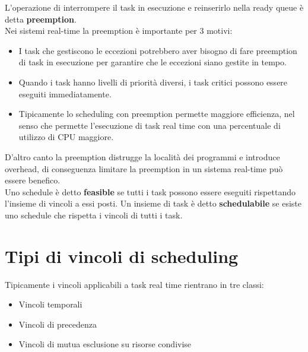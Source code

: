 \documentclass[12pt,openany,onesided]{book}
\begin{document}
L'operazione di interrompere il task in esecuzione e reinserirlo nella ready queue è detta \textbf{preemption}.\\
Nei sistemi real-time la preemption è importante per 3 motivi:
\begin{itemize}
    \item I task che gestiscono le eccezioni potrebbero aver bisogno di fare preemption di task in esecuzione per garantire che le eccezioni siano gestite in tempo.
    \item Quando i task hanno livelli di priorità diversi, i task critici possono essere eseguiti immediatamente.
    \item Tipicamente lo scheduling con preemption permette maggiore efficienza, nel senso che permette l'esecuzione di task real time con una percentuale di utilizzo di CPU maggiore.
\end{itemize}
D'altro canto la preemption distrugge la località dei programmi e introduce overhead, di conseguenza limitare la preemption in un sistema real-time può essere benefico.
\\
Uno schedule è detto \textbf{feasible} se tutti i task possono essere eseguiti rispettando l'insieme di vincoli a essi posti.
Un insieme di task è detto \textbf{schedulabile} se esiste uno schedule che rispetta i vincoli di tutti i task.
\section{Tipi di vincoli di scheduling}
Tipicamente i vincoli applicabili a task real time rientrano in tre classi:
\begin{itemize}
    \item Vincoli temporali
    \item Vincoli di precedenza
    \item Vincoli di mutua esclusione su risorse condivise
\end{itemize}
\end{document}
